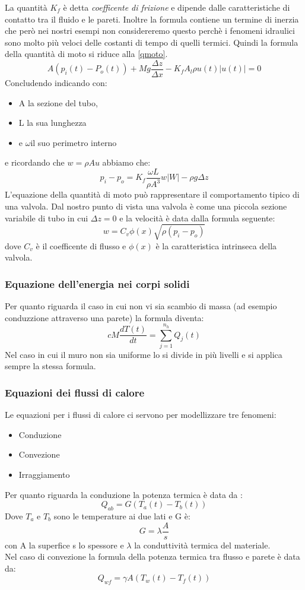 La quantità $K_f$ è detta \emph{coefficente di frizione} e dipende dalle caratteristiche di contatto tra il fluido e le pareti. Inoltre la formula contiene un termine di inerzia che però nei nostri esempi non considereremo questo perchè i fenomeni idraulici sono molto più veloci delle costanti di tempo di quelli termici. Quindi la formula della quantità di moto si riduce alla \ref{qmoto}.
\begin{equation}
\label{qmoto}
A(p_i(t)-P_o(t))+Mg\frac{\Delta z}{\Delta x}-K_f A_l \rho u(t)|u(t)|=0
\end{equation}
Concludendo indicando con:
\begin{itemize}
\item A la sezione del tubo,
\item L la sua lunghezza
\item e $\omega $il suo perimetro interno
\end{itemize}
e ricordando che $w=\rho A u$ abbiamo che:
$$p_i-p_o= K_f\frac{\omega L}{\rho A^3} w|W|-\rho g\Delta z$$
L'equazione della quantità di moto può rappresentare il comportamento tipico di una valvola. Dal nostro punto di vista una valvola è come una piccola sezione variabile di tubo in cui $\Delta z =0$ e la velocità è data dalla formula seguente:
$$w=C_v\phi(x)\sqrt{\rho (p_i - p_o)}$$
dove $C_v$ è il coefficente di flusso e $\phi(x)$ è la caratteristica intrinseca della valvola.
\subsubsection{Equazione dell'energia nei corpi solidi}
Per quanto riguarda il caso in cui non vi sia scambio di massa (ad esempio conduzzione attraverso una parete) la formula diventa:
$$cM\frac{dT(t)}{dt}=\sum_{j=1}^{n_h}Q_j(t)$$
Nel caso in cui il muro non sia uniforme lo si divide in più livelli e si applica sempre la stessa formula.\\
\subsubsection{Equazioni dei flussi di calore}
Le equazioni per i flussi di calore ci servono per modellizzare tre fenomeni:
\begin{itemize}
\item Conduzione
\item Convezione
\item Irraggiamento
\end{itemize}
Per quanto riguarda la conduzione la potenza termica è data da :
$$Q_{ab}=G(T_a(t)-T_b(t))$$
Dove $T_a$ e $T_b$ sono le temperature ai due lati e G è:
$$G=\lambda \frac{A}{s}$$
con A la superfice s lo spessore e $\lambda$ la conduttività termica del materiale.\\
Nel caso di convezione la formula della potenza termica tra flusso e parete è data da:
$$Q_{wf}=\gamma A(T_w(t)-T_f(t))$$
